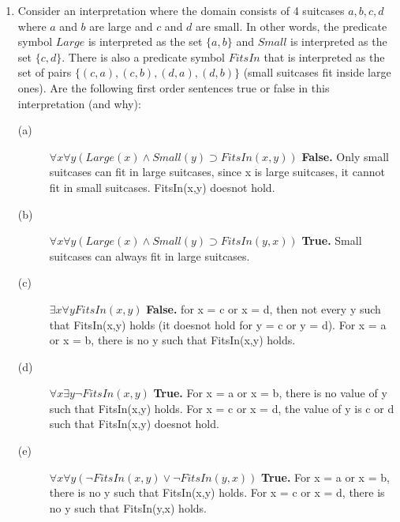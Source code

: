 \documentclass{article}
\begin{document}
\begin{enumerate}
\item Consider an interpretation where the domain consists of 4 suitcases
$a,b,c,d$ where $a$ and $b$ are large and $c$ and $d$ are small. In other words, 
the predicate symbol $Large$ is interpreted as the set $\{a,b\}$ and $Small$ is
interpreted as the set $\{c,d\}$. There is also a predicate symbol $FitsIn$ that
is interpreted as the set of pairs $\{(c,a),(c,b), (d,a), (d,b)\}$ (small suitcases fit inside large  ones).
Are the following first order sentences true or false in this
interpretation (and why):
\begin{description}
\item[(a)] $\forall x \forall y (Large(x) \wedge Small(y) \supset FitsIn(x,y))$
\newline \textbf{False.} Only small suitcases can fit in large suitcases, since x is large suitcases, it cannot fit in small suitcases. FitsIn(x,y) doesnot hold.
\item[(b)] $\forall x \forall y (Large(x) \wedge Small(y) \supset FitsIn(y,x))$
\newline \textbf{True.} Small suitcases can always fit in large suitcases.
\item[(c)] $\exists x \forall y FitsIn(x,y)$
\newline \textbf{False.} for x = c or x = d, then not every y such that FitsIn(x,y) holds (it doesnot hold for y = c or y = d). For x = a or x = b, there is no y such that FitsIn(x,y) holds. 
\item[(d)] $\forall x \exists y \neg FitsIn(x,y)$
\newline \textbf{True.} For x = a or x = b, there is no value of y such that FitsIn(x,y) holds. For x = c or x = d, the value of y is c or d such that FitsIn(x,y) doesnot hold.   
\item[(e)] $\forall x \forall y (\neg FitsIn(x,y) \vee \neg FitsIn(y,x))$
\newline \textbf{True.} For x = a or x = b, there is no y such that FitsIn(x,y) holds. For x = c or x = d, there is no y such that FitsIn(y,x) holds. 
\end{description}
\end{enumerate}
\end{document}
